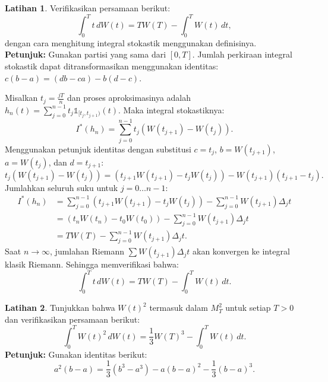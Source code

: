 \documentclass[aspectratio=169,11pt]{beamer}
\theoremstyle{definition}
\newtheorem{latihan}{Latihan}
\begin{document}
\begin{frame}{\insertsection}{\insertsubsection}
  \begin{latihan}
    Verifikasikan persamaan berikut:
    \begin{equation*}
      \int_0^T t \, dW(t) = T W(T) - \int_0^T W(t) \, dt,
    \end{equation*}
    dengan cara menghitung integral stokastik menggunakan definisinya.\\
    \textbf{Petunjuk:} Gunakan partisi yang sama dari $[0, T]$. Jumlah perkiraan integral stokastik dapat ditransformasikan menggunakan identitas:
    $c(b-a) = (db - ca) - b(d - c)$.
  \end{latihan}
\end{frame}

\begin{frame}[allowframebreaks]{\insertsection}{\insertsubsection}
  Misalkan $t_j = \frac{jT}{n}$ dan proses aproksimasinya adalah $h_n(t) = \sum_{j=0}^{n-1} t_j \mathds{1}_{[t_j, t_{j+1})}(t)$.
  Maka integral stokastiknya:
  \begin{equation*}
    I^*(h_n) = \sum_{j=0}^{n-1} t_j (W(t_{j+1}) - W(t_j)).
  \end{equation*}
  Menggunakan petunjuk identitas dengan substitusi $c = t_j$, $b = W(t_{j+1})$, $a = W(t_j)$, dan $d = t_{j+1}$:
  \begin{equation*}
    t_j(W(t_{j+1}) - W(t_j)) = (t_{j+1}W(t_{j+1}) - t_jW(t_j)) - W(t_{j+1})(t_{j+1} - t_j).
  \end{equation*}
  Jumlahkan seluruh suku untuk $j=0 \dots n-1$:
  \begin{align*}
    I^*(h_n) & = \sum_{j=0}^{n-1} (t_{j+1}W(t_{j+1}) - t_jW(t_j)) - \sum_{j=0}^{n-1} W(t_{j+1}) \Delta_j t \\
             & = (t_n W(t_n) - t_0 W(t_0)) - \sum_{j=0}^{n-1} W(t_{j+1}) \Delta_j t                        \\
             & = T W(T) - \sum_{j=0}^{n-1} W(t_{j+1}) \Delta_j t.
  \end{align*}
  Saat $n \to \infty$, jumlahan Riemann $\sum W(t_{j+1}) \Delta_j t$ akan konvergen ke integral klasik Riemann. Sehingga memverifikasi bahwa:
  \begin{equation*}
    \int_0^T t \, dW(t) = T W(T) - \int_0^T W(t) \, dt.
  \end{equation*}
\end{frame}

\begin{frame}{\insertsection}{\insertsubsection}
  \begin{latihan}
    Tunjukkan bahwa $W(t)^2$ termasuk dalam $M_T^2$ untuk setiap $T > 0$ dan verifikasikan persamaan berikut:
    \begin{equation*}
      \int_0^T W(t)^2 \, dW(t) = \frac{1}{3} W(T)^3 - \int_0^T W(t) \, dt.
    \end{equation*}
    \textbf{Petunjuk:} Gunakan identitas berikut:
    \begin{equation*}
      a^2(b-a) = \frac{1}{3}(b^3 - a^3) - a(b-a)^2 - \frac{1}{3}(b-a)^3.
    \end{equation*}
  \end{latihan}
\end{frame}
\end{document}
